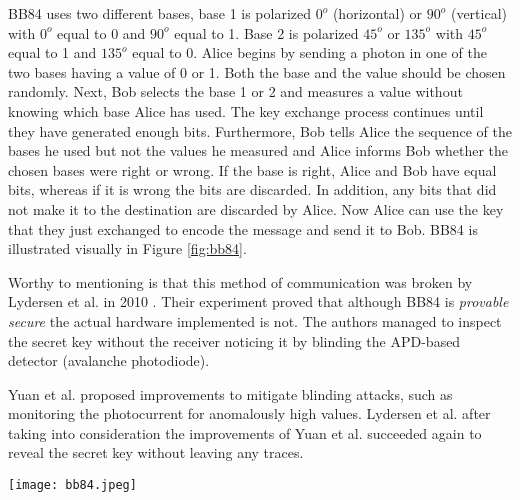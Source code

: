 \documentclass[conference, letterpaper]{IEEEtran}
\begin{document}
BB84 uses two different bases, base 1 is polarized $0^{o}$ (horizontal) or $90^{o}$ (vertical) with $0^{o}$ equal to 0 and $90^{o}$ equal to 1. Base 2 is polarized $45^{o}$ or $135^{o}$ with $45^{o}$ equal to 1 and $135^{o}$ equal to 0. Alice begins by sending a photon in one of the two bases having a value of 0 or 1. Both the base and the value should be chosen randomly. Next, Bob selects the base 1 or 2 and measures a value without knowing which base Alice has used. The key exchange process continues until they have generated enough bits. Furthermore, Bob tells Alice the sequence of the bases he used but not the values he measured and Alice informs Bob whether the chosen bases were right or wrong. If the base is right, Alice and Bob have equal bits, whereas if it is wrong the bits are discarded. In addition, any bits that did not make it to the destination are discarded by Alice. Now Alice can use the key that they just exchanged to encode the message and send it to Bob. BB84 is illustrated visually in Figure \ref{fig:bb84}.

Worthy to mentioning is that this method of communication was broken by Lydersen et al. in 2010 \cite{QKD_hacked}. Their experiment proved that although BB84 is \textit{provable secure} the actual hardware implemented is not. 
The authors managed to inspect the secret key without the receiver noticing it by blinding the APD-based detector (avalanche photodiode). 


Yuan et al. \cite{Avoid_QKD_hacking} proposed improvements to mitigate blinding attacks, such as monitoring the photocurrent for anomalously high values. Lydersen et al. \cite{Reply_to_Avoid_QKD_hacking} after taking into consideration the improvements of Yuan et al. \cite{Avoid_QKD_hacking} succeeded again to reveal the secret key without leaving any traces. 

 \begin{figure*}[h]
	\centering
		\texttt{[image: bb84.jpeg]}
	\caption{Key exchange in the BB84 protocol implemented with polarization of photons (adapted from \cite{Makarov2007}).}
 	\label{fig:bb84}
 \end{figure*}
\end{document}
